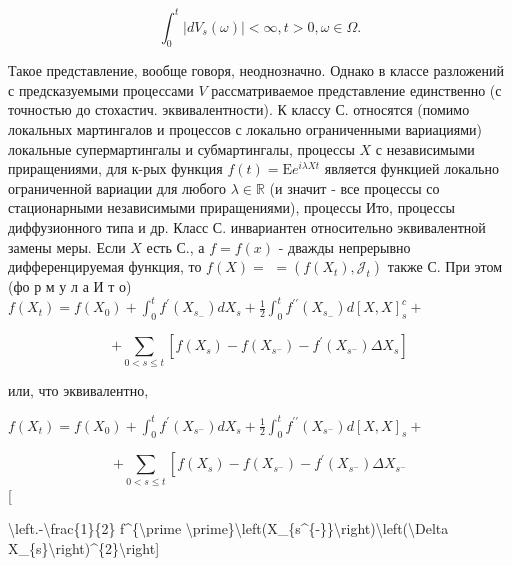 \documentclass[10pt]{article}
\begin{document}
\[

\int_{0}^{t}\left|d V_{s}(\omega)\right|<\infty, t>0, \omega \in \Omega .

\]



Такое представление, вообще говоря, неоднозначно. Однако в классе разложений с предсказуемыми процессами $V$ рассматриваемое представление единственно (с точностью до стохастич. эквивалентности). К классу С. относятся (помимо локальных мартингалов и процессов с локально ограниченными вариациями) локальные супермартингалы и субмартингалы, процессы $X$ с независимыми приращениями, для к-рых функция $f(t)=\mathrm{E} e^{i \lambda X t}$ является функцией локально ограниченной вариации для любого $\lambda \in \mathbb{R}$ (и значит - все процессы со стационарными независимыми приращениями), процессы Ито, процессы диффузионного типа и др. Класс С. инвариантен относительно эквивалентной замены меры. Если $X$ есть С., а $f=f(x)$ - дважды непрерывно дифференцируемая функция, то $f(X)=$ $=\left(f\left(X_{t}\right), \mathscr{J}_{t}\right)$ также С. При этом (фо р м у л а И т о) $f\left(X_{t}\right)=f\left(X_{0}\right)+\int_{0}^{t} f^{\prime}\left(X_{s_{-}}\right) d X_{s}+\frac{1}{2} \int_{0}^{t} f^{\prime \prime}\left(X_{s_{-}}\right) d[X, X]_{s}^{c}+$



\[

+\sum_{0<s \leqslant t}\left[f\left(X_{s}\right)-f\left(X_{s^{-}}\right)-f^{\prime}\left(X_{s^{-}}\right) \Delta X_{s}\right]

\]



или, что эквивалентно,



$f\left(X_{t}\right)=f\left(X_{0}\right)+\int_{0}^{t} f^{\prime}\left(X_{s^{-}}\right) d X_{s}+\frac{1}{2} \int_{0}^{t} f^{\prime \prime}\left(X_{s^{-}}\right) d[X, X]_{s}+$



\[

+\sum_{0<s \leqslant t}\left[f\left(X_{s}\right)-f\left(X_{s^{-}}\right)-f^{\prime}\left(X_{s^{-}}\right) \Delta X_{s^{-}}\right.

\][



\textbackslash left.-\textbackslash frac\{1\}\{2\} f\^{}\{\textbackslash prime \textbackslash prime\}\textbackslash left(X\_\{s\^{}\{-\}\}\textbackslash right)\textbackslash left(\textbackslash Delta X\_\{s\}\textbackslash right)\^{}\{2\}\textbackslash right]
\end{document}
